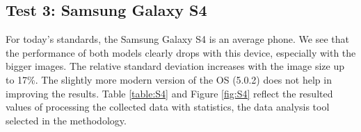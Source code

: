 \subsection{Test 3: Samsung Galaxy S4}
For today's standards, the Samsung Galaxy S4 is an average phone. We see that the performance of both models clearly drops with this device, especially with the bigger images. The relative standard deviation increases with the image size up to 17\%. The slightly more modern version of the OS (5.0.2) does not help in improving the results. Table \ref{table:S4} and Figure \ref{fig:S4} reflect the resulted values of processing the collected data with statistics, the data analysis tool selected in the methodology. \\

\begin{table}[h!]
\centering
{}
\caption{Samsung Galaxy S4 test results}
\label{table:S4}
\end{table}

